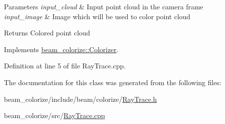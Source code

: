 \begin{DoxyParams}{Parameters}
{\em input\+\_\+cloud} & Input point cloud in the camera frame \\
\hline
{\em input\+\_\+image} & Image which will be used to color point cloud \\
\hline
\end{DoxyParams}
\begin{DoxyReturn}{Returns}
Colored point cloud 
\end{DoxyReturn}


Implements \hyperlink{classbeam__colorize_1_1_colorizer_ab9ca2ddf55fd8782e6b31c64e85efcbc}{beam\+\_\+colorize\+::\+Colorizer}.



Definition at line 5 of file Ray\+Trace.\+cpp.



The documentation for this class was generated from the following files\+:\begin{DoxyCompactItemize}
\item 
beam\+\_\+colorize/include/beam/colorize/\hyperlink{_ray_trace_8h}{Ray\+Trace.\+h}\item 
beam\+\_\+colorize/src/\hyperlink{_ray_trace_8cpp}{Ray\+Trace.\+cpp}\end{DoxyCompactItemize}
